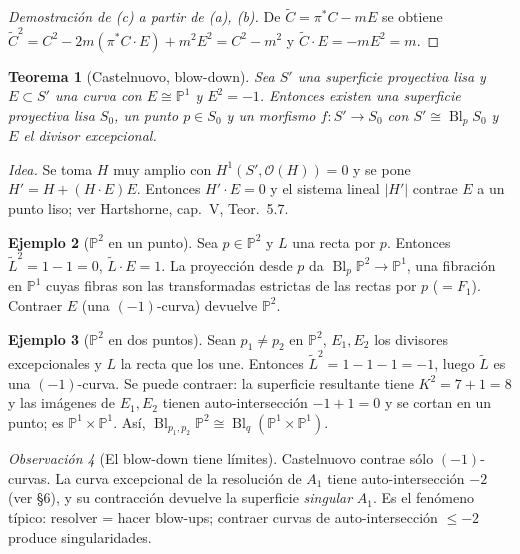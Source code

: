 \documentclass[11pt,a4paper]{article}
\newcommand{\Bl}{\operatorname{Bl}}
\newcommand{\PP}{\mathbb{P}}
\newcommand{\cO}{\mathcal{O}}
\theoremstyle{plain}
\newtheorem{teorema}{Teorema}[section]
\theoremstyle{definition}
\newtheorem{ejemplo}[teorema]{Ejemplo}
\theoremstyle{remark}
\newtheorem{observacion}[teorema]{Observación}
\begin{document}
\begin{proof}[Demostración de (c) a partir de (a), (b)]
De $\tilde C=\pi^*C-mE$ se obtiene $\tilde C^2=C^2-2m(\pi^*C\cdot E)+m^2E^2=C^2-m^2$ y $\tilde C\cdot E=-mE^2=m$.
\end{proof}

\begin{teorema}[Castelnuovo, blow-down]\label{teo:castelnuovo}
Sea $S'$ una superficie proyectiva lisa y $E\subset S'$ una curva con $E\cong\PP^1$ y $E^2=-1$. Entonces existen una superficie proyectiva lisa $S_0$, un punto $p\in S_0$ y un morfismo $f\colon S'\to S_0$ con $S'\cong\Bl_pS_0$ y $E$ el divisor excepcional.
\end{teorema}

\noindent\emph{Idea.} Se toma $H$ muy amplio con $H^1(S',\cO(H))=0$ y se pone $H'=H+(H\cdot E)E$. Entonces $H'\cdot E=0$ y el sistema lineal $|H'|$ contrae $E$ a un punto liso; ver Hartshorne, cap.~V, Teor.~5.7.

\begin{ejemplo}[$\PP^2$ en un punto]
Sea $p\in\PP^2$ y $L$ una recta por $p$. Entonces $\tilde L^2=1-1=0$, $\tilde L\cdot E=1$. La proyección desde $p$ da $\Bl_p\PP^2\to\PP^1$, una fibración en $\PP^1$ cuyas fibras son las transformadas estrictas de las rectas por $p$ ($=F_1$). Contraer $E$ (una $(-1)$-curva) devuelve $\PP^2$.
\end{ejemplo}

\begin{ejemplo}[$\PP^2$ en dos puntos]\label{ej:dospuntos}
Sean $p_1\ne p_2$ en $\PP^2$, $E_1,E_2$ los divisores excepcionales y $L$ la recta que los une. Entonces $\tilde L^2=1-1-1=-1$, luego $\tilde L$ es una $(-1)$-curva. Se puede contraer: la superficie resultante tiene $K^2=7+1=8$ y las imágenes de $E_1,E_2$ tienen auto-intersección $-1+1=0$ y se cortan en un punto; es $\PP^1\times\PP^1$. Así, $\Bl_{p_1,p_2}\PP^2\cong\Bl_q(\PP^1\times\PP^1)$.
\end{ejemplo}

\begin{observacion}[El blow-down tiene límites]
Castelnuovo contrae sólo $(-1)$-curvas. La curva excepcional de la resolución de $A_1$ tiene auto-intersección $-2$ (ver \S6), y su contracción devuelve la superficie \emph{singular} $A_1$. Es el fenómeno típico: resolver = hacer blow-ups; contraer curvas de auto-intersección $\le-2$ produce singularidades.
\end{observacion}

\end{document}
